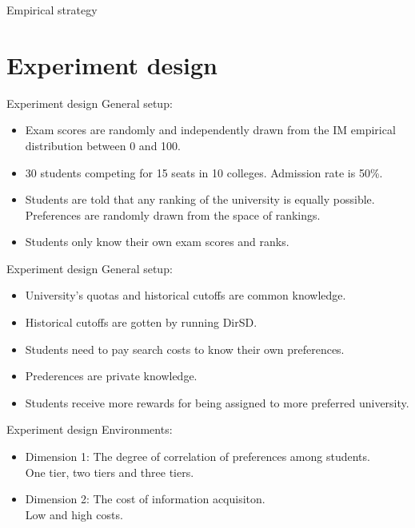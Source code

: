 \documentclass[dvipsnames,mathserif]{beamer}
\begin{document}
{\begin{frame}{Empirical strategy}
\begin{itemize}
    \end{itemize}
\end{frame}



\section{Experiment design}
\begin{frame}{Experiment design}
\large General setup:
\vspace{0.5cm}
    \begin{itemize}
        \item Exam scores are randomly and independently drawn from the IM empirical distribution between 0 and 100.
        \item 30 students competing for 15 seats in 10 colleges. Admission rate is 50\%.
        \item Students are told that any ranking of the university is equally possible. Preferences are randomly drawn from the space of rankings.
        \item Students only know their own exam scores and ranks. 

    \end{itemize}
\end{frame}

\begin{frame}{Experiment design}
\large
General setup:
\vspace{0.5cm}
    \begin{itemize}
        \item University's quotas and historical cutoffs are common knowledge. 
        \item Historical cutoffs are gotten by running DirSD.
        \item Students need to pay search costs to know their own preferences.
        \item Prederences are private knowledge.
        \item Students receive more rewards for being assigned to more preferred university.
    \end{itemize}
\end{frame}

\begin{frame}{Experiment design}
\large
Environments:
\vspace{0.5cm}
    \begin{itemize}
        \item Dimension 1: The degree of correlation of preferences among students.\\
        One tier, two tiers and three tiers.
        \item Dimension 2: The cost of information acquisiton.\\
        Low and high costs.
    \end{itemize}
\end{frame}

}
\end{document}

